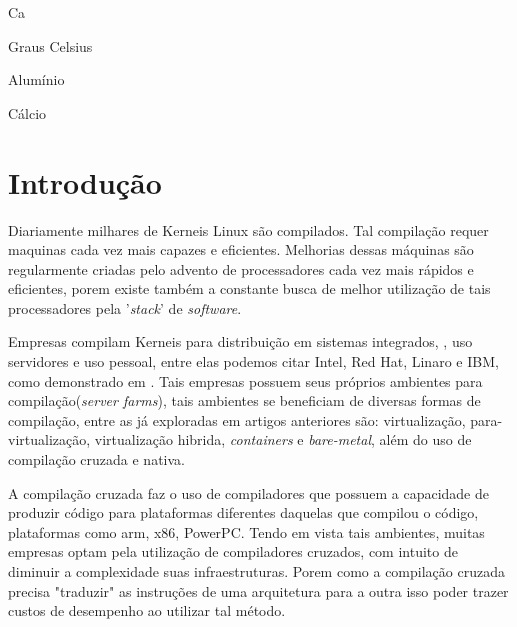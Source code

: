 \documentclass[twoside,english,brazilian]{UNISINOSmonografia}
\begin{document}
%
\begin{listadesimbolos}{Ca}
\item[\textsuperscript{o}C] Graus Celsius
\item[Al] Alumínio
\item[Ca] Cálcio
\end{listadesimbolos}

\tableofcontents

\chapter{Introdução}


Diariamente milhares de Kerneis Linux são compilados. Tal compilação requer maquinas cada vez mais capazes e eficientes. Melhorias dessas máquinas são regularmente criadas pelo advento de processadores cada vez mais rápidos e eficientes, porem existe também a constante busca de melhor utilização de tais processadores pela '\textit{stack}' de \textit{software}.

Empresas compilam Kerneis para distribuição em sistemas integrados, , uso servidores e uso pessoal, entre elas podemos citar Intel, Red Hat, Linaro e IBM, como demonstrado em . Tais empresas possuem seus próprios ambientes para compilação(\textit{server farms}), tais ambientes se beneficiam de diversas formas de compilação, entre as já exploradas em artigos anteriores são: virtualização, para-virtualização, virtualização hibrida, \textit{containers} e \textit{bare-metal}, além do uso de compilação cruzada e nativa.

A compilação cruzada faz o uso de compiladores que possuem a capacidade de produzir código para plataformas diferentes daquelas que compilou o código, plataformas como arm, x86, PowerPC. Tendo em vista tais ambientes, muitas empresas optam pela utilização de compiladores cruzados, com intuito de diminuir a complexidade suas infraestruturas. Porem como a compilação cruzada precisa "traduzir" as instruções de uma arquitetura para a outra isso poder trazer custos de desempenho ao utilizar tal método.
\end{document}
